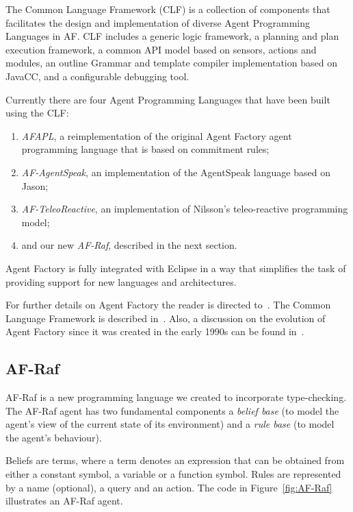 \documentclass[preprint]{sigplanconf} %
\begin{document}
The Common Language Framework (CLF) is a collection of components that
facilitates the design and implementation of diverse Agent Programming
Languages in AF. CLF includes a generic logic framework, a planning and
plan execution framework, a common API model based on sensors, actions and
modules, an outline Grammar and template compiler implementation based on
JavaCC, and a configurable debugging tool.

Currently there are four Agent Programming Languages that have been built
using the CLF: 
\begin{enumerate}

\item \textit{AFAPL}, a reimplementation of the original Agent Factory
agent programming language that is based on commitment rules;

\item \textit{AF-AgentSpeak}, an implementation of the AgentSpeak language based on Jason;

\item \textit{AF-TeleoReactive}, an implementation of Nilsson's teleo-reactive
programming model; 

\item and our new \textit{AF-Raf}, described in the next section.
\end{enumerate}

Agent Factory is fully integrated with Eclipse in a way that simplifies
the task of providing support for new languages and architectures.

For further details on Agent Factory the reader is directed
to~\cite{collier2009modeling}. The Common Language Framework is described
in~\cite{russell2011af}. Also, a discussion on the evolution of Agent Factory since it
was created in the early 1990s can be found in~\cite{muldoon2009towards}.

\subsection{AF-Raf}
AF-Raf is a new programming language we created to incorporate
type-checking. The AF-Raf agent has two fundamental components a
\textit{belief base} (to model the agent's view of the current state of its
environment) and a \textit{rule base} (to model the agent's behaviour).

Beliefs are terms, where a term denotes an expression that can be obtained
from either a constant symbol, a variable or a function symbol. Rules are
represented by a name (optional), a query and an action.  The code in
Figure~\ref{fig:AF-Raf} illustrates an AF-Raf agent.
\end{document}
